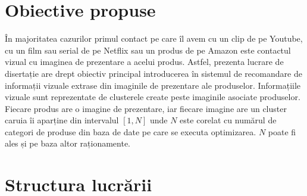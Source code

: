 \section{Obiective propuse}
În majoritatea cazurilor primul contact pe care îl avem cu un clip de pe Youtube, cu un film sau serial de pe Netflix sau un produs de pe Amazon este contactul vizual cu imaginea de prezentare a acelui produs.
Astfel, prezenta lucrare de disertație are drept obiectiv principal introducerea în sistemul de recomandare de informații vizuale extrase din imaginile de prezentare ale produselor. Informațiile vizuale sunt reprezentate de clusterele create peste imaginile asociate produselor. Fiecare produs are o imagine de prezentare, iar fiecare imagine are un cluster caruia îi aparține din intervalul $[1, N]$ unde $N$ este corelat cu numărul de categori de produse din baza de date pe care se executa optimizarea. $N$ poate fi ales și pe baza altor raționamente.

\section{Structura lucrării}